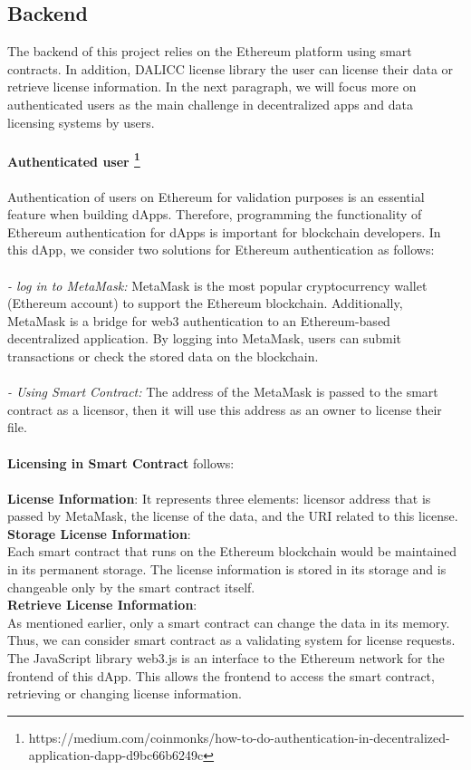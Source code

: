 \subsection{Backend} The backend of this project relies on the Ethereum platform using smart contracts. In addition, DALICC license library the user can license their data or retrieve license information. In the next paragraph, we will focus more on authenticated users as the main challenge in decentralized apps and data licensing systems by users.\\
\\
\textbf{Authenticated user \footnote{https://medium.com/coinmonks/how-to-do-authentication-in-decentralized-application-dapp-d9bc66b6249c}} \\
\\
Authentication of users on Ethereum for validation purposes is an essential feature when building dApps. Therefore, programming the functionality of Ethereum authentication for dApps is important for blockchain developers. 
In this dApp, we consider two solutions for Ethereum authentication as follows: \\
\\
\textit{- log in to MetaMask:} MetaMask is the most popular cryptocurrency wallet (Ethereum account) to support the Ethereum blockchain. Additionally, MetaMask is a bridge for web3 authentication to an Ethereum-based decentralized application. By logging into MetaMask, users can submit transactions or check the stored data on the blockchain.\\
\\
\textit{- Using Smart Contract:} The address of the MetaMask is passed to the smart contract as a licensor, then it will use this address as an owner to license their file. \\
\\
\textbf{Licensing in Smart Contract} follows: \\
\\
\textbf{License Information}: It represents three elements: licensor address that is passed by MetaMask, the license of the data, and the URI related to this license.\\
\textbf{Storage License Information}: \\Each smart contract that runs on the Ethereum blockchain would be maintained in its permanent storage. The license information is stored in its storage and is changeable only by the smart contract itself.\\
\textbf{Retrieve License Information}: \\As mentioned earlier, only a smart contract can change the data in its memory. Thus, we can consider smart contract as a validating system for license requests. The JavaScript library web3.js is an interface to the Ethereum network for the frontend of this dApp. This allows the frontend to access the smart contract, retrieving or changing license information.\\
